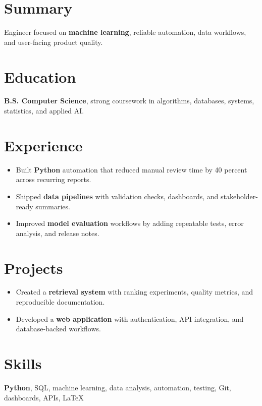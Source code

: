 \documentclass[10pt]{article}
\begin{document}
\section*{Summary}
Engineer focused on \textbf{machine learning}, reliable automation, data workflows, and user-facing product quality.
\section*{Education}
\textbf{B.S. Computer Science}, strong coursework in algorithms, databases, systems, statistics, and applied AI.
\section*{Experience}
\begin{itemize}\item Built \textbf{Python} automation that reduced manual review time by 40 percent across recurring reports.\item Shipped \textbf{data pipelines} with validation checks, dashboards, and stakeholder-ready summaries.\item Improved \textbf{model evaluation} workflows by adding repeatable tests, error analysis, and release notes.\end{itemize}
\section*{Projects}
\begin{itemize}\item Created a \textbf{retrieval system} with ranking experiments, quality metrics, and reproducible documentation.\item Developed a \textbf{web application} with authentication, API integration, and database-backed workflows.\end{itemize}
\section*{Skills}
\textbf{Python}, SQL, machine learning, data analysis, automation, testing, Git, dashboards, APIs, LaTeX
\end{document}
